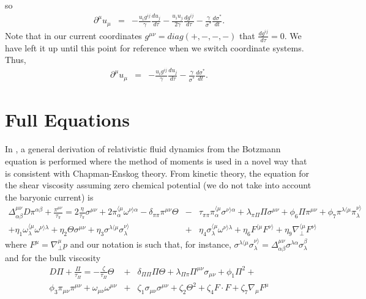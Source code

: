 \documentclass[aps,article]{revtex4}
\begin{document}
so
\begin{eqnarray}
\partial^{\mu}u_{\mu}&=&-\frac{u_i g^{ij}}{\gamma}\frac{du_j}{d\tau}-\frac{u_i u_j}{2\gamma}\frac{dg^{ij}}{d\tau}-\frac{\gamma}{\sigma^*}\frac{d\sigma^*}{dt}.
\end{eqnarray}
Note that in our current coordinates $g^{\mu\nu}=diag(+,-,-,-)$ that $\frac{dg^{ij}}{d\tau}=0$.  We have left it up until this point for reference when we switch coordinate systems. Thus,
\begin{eqnarray}
\partial^{\mu}u_{\mu}&=&-\frac{u_i g^{ij}}{\gamma}\frac{du_j}{d\tau}-\frac{\gamma}{\sigma^*}\frac{d\sigma^*}{dt}.
\end{eqnarray}


\section{Full Equations}\label{app:full}
In \cite{gabriellatest}, a general derivation of relativistic fluid dynamics from the Botzmann equation is performed where the method of moments is used in a novel way that is consistent with Chapman-Enskog theory.  From kinetic theory, the equation for the shear viscosity assuming zero chemical potential (we do not take into account the baryonic current) is
\begin{eqnarray}\label{eqn:shearall}
\Delta_{\alpha \beta}^{\mu\nu}D\pi^{\alpha\beta}+\frac{\pi^{\mu\nu}}{\tau_{\pi}}=2\frac{\eta}{\tau_{\pi}}\sigma^{\mu\nu}+
2\pi_{\alpha}^{\langle\mu}\omega^{\nu\rangle\alpha}-\delta_{\pi\pi}\pi^{\mu\nu}\Theta&-&\tau_{\pi\pi}\pi_{\alpha}^{\langle\mu}\sigma^{\nu\rangle\alpha}+\lambda_{\pi\Pi}\Pi\sigma^{\mu\nu}+\phi_6\Pi\pi^{\mu\nu}+\phi_7\pi^{\lambda\langle\mu}\pi^{\nu\rangle}_{\lambda}\nonumber\\
+\eta_1\omega_{\lambda}^{\langle\mu}\omega^{\nu\rangle\lambda}+\eta_2\Theta\sigma^{\mu\nu}+\eta_3\sigma^{\lambda\langle\mu}\sigma^{\nu\rangle}_{\lambda}&+&\eta_4\sigma^{\langle\mu}_{\lambda}\omega^{\nu\rangle\lambda}+\eta_6 F^{\langle\mu}F^{\nu\rangle}+\eta_9\nabla^{\langle\mu}_{\perp}F^{\nu\rangle}
\end{eqnarray}
where $F^{\mu}=\nabla_{\perp}^{\mu}p$ and our notation is such that, for instance, $\sigma^{\lambda\langle\mu}\sigma^{\nu\rangle}_{\lambda}=\Delta_{\alpha\beta}^{\mu\nu}\sigma^{\lambda\alpha}\sigma_{\lambda}^{\beta}$ and for the bulk viscosity
\begin{eqnarray}\label{eqn:bulkall}
D\Pi+\frac{\Pi}{\tau_{\Pi}}=-\frac{\zeta}{\tau_{\Pi}}\Theta&+&\delta_{\Pi\Pi}\Pi\Theta+\lambda_{\Pi\pi}\Pi^{\mu\nu}\sigma_{\mu\nu}+\phi_1\Pi^2+\nonumber\\
\phi_3\pi_{\mu\nu}\pi^{\mu\nu}+\omega_{\mu\nu}\omega^{\mu\nu}&+&\zeta_1\sigma_{\mu\nu}\sigma^{\mu\nu}+\zeta_2\Theta^2+\zeta_4 F\cdot F+\zeta_7\nabla_{\mu}F^{\mu}
\end{eqnarray}
\end{document}
